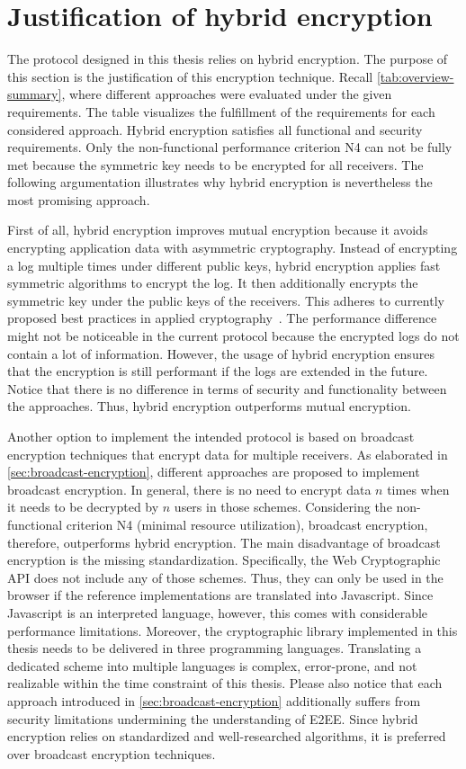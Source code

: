 \documentclass[../main.tex]{subfiles}
\begin{document}
\section{Justification of hybrid encryption}
\label{sec:justification}
The protocol designed in this thesis relies on hybrid encryption.
The purpose of this section is the justification of this encryption technique.
Recall \cref{tab:overview-summary}, where different approaches were evaluated under the given requirements.
The table visualizes the fulfillment of the requirements for each considered approach.
Hybrid encryption satisfies all functional and security requirements.
Only the non-functional performance criterion N4 can not be fully met because the symmetric key needs to be encrypted for all receivers.
The following argumentation illustrates why hybrid encryption is nevertheless the most promising approach.

First of all, hybrid encryption improves mutual encryption because it avoids encrypting application data with asymmetric cryptography.
Instead of encrypting a log multiple times under different public keys, hybrid encryption applies fast symmetric algorithms to encrypt the log.
It then additionally encrypts the symmetric key under the public keys of the receivers.
This adheres to currently proposed best practices in applied cryptography~\cite[340]{Eckert2018}.
The performance difference might not be noticeable in the current protocol because the encrypted logs do not contain a lot of information.
However, the usage of hybrid encryption ensures that the encryption is still performant if the logs are extended in the future.
Notice that there is no difference in terms of security and functionality between the approaches.
Thus, hybrid encryption outperforms mutual encryption.

Another option to implement the intended protocol is based on broadcast encryption techniques that encrypt data for multiple receivers.
As elaborated in \cref{sec:broadcast-encryption}, different approaches are proposed to implement broadcast encryption.
In general, there is no need to encrypt data $n$ times when it needs to be decrypted by $n$ users in those schemes.
Considering the non-functional criterion N4 (minimal resource utilization), broadcast encryption, therefore, outperforms hybrid encryption.
The main disadvantage of broadcast encryption is the missing standardization.
Specifically, the Web Cryptographic API does not include any of those schemes.
Thus, they can only be used in the browser if the reference implementations are translated into Javascript.
Since Javascript is an interpreted language, however, this comes with considerable performance limitations.
Moreover, the cryptographic library implemented in this thesis needs to be delivered in three programming languages.
Translating a dedicated scheme into multiple languages is complex, error-prone, and not realizable within the time constraint of this thesis.
Please also notice that each approach introduced in \cref{sec:broadcast-encryption} additionally suffers from security limitations undermining the understanding of E2EE.
Since hybrid encryption relies on standardized and well-researched algorithms, it is preferred over broadcast encryption techniques.
\end{document}
